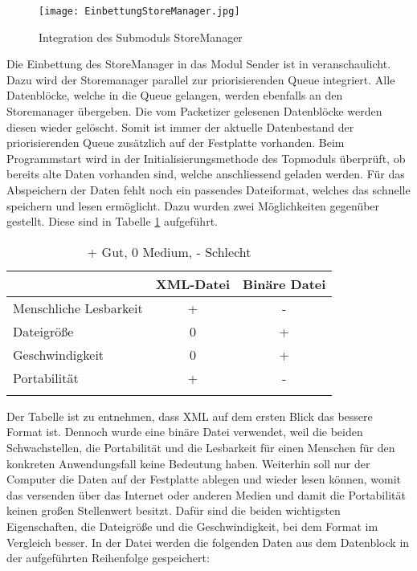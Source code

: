 \begin{figure}[htb]
\centering
\texttt{[image: EinbettungStoreManager.jpg]}
\caption{Integration des Submoduls StoreManager}
\label{fig:EinbettungStoreManager}
\end{figure}

Die Einbettung des StoreManager in das Modul Sender ist in 
 veranschaulicht. Dazu wird der Storemanager
parallel zur priorisierenden Queue integriert. Alle Datenblöcke, welche in
die Queue gelangen, werden ebenfalls an den Storemanager übergeben. Die vom
Packetizer gelesenen Datenblöcke werden diesen wieder gelöscht. Somit
ist immer der aktuelle Datenbestand der priorisierenden Queue zusätzlich auf der
Festplatte vorhanden. Beim Programmstart wird in der
Initialisierungsmethode des Topmoduls überprüft, ob bereits alte Daten
vorhanden sind, welche anschliessend geladen werden. \newline
Für das Abspeichern der Daten fehlt noch ein passendes Dateiformat,
welches das schnelle speichern und lesen ermöglicht. Dazu wurden zwei Möglichkeiten
gegenüber gestellt. Diese sind in Tabelle \ref{tab:Speicherformate} aufgeführt.

\begin{longtable}{|lcc|}
\caption{Vergleich der Speicherformate} \\
\hline
\label{tab:Speicherformate}
\textbf{} & \textbf{XML-Datei} & \textbf{Binäre Datei}\\
\hline
  Menschliche Lesbarkeit      &  + & - \\
  Dateigröße      &  0 & + \\
  Geschwindigkeit &  0 & + \\
  Portabilität    &  + & - \\
\hline
\caption*{ + Gut, 0 Medium, - Schlecht }
\end{longtable}

Der Tabelle ist zu entnehmen, dass XML auf dem ersten Blick das bessere Format
ist. Dennoch wurde eine binäre Datei verwendet, weil die beiden Schwachstellen,
die Portabilität und die Lesbarkeit für einen Menschen für den konkreten
Anwendungsfall keine Bedeutung haben.
Weiterhin soll nur der Computer die Daten auf der Festplatte ablegen und
wieder lesen können, womit das versenden über das Internet oder anderen Medien
und damit die Portabilität keinen großen Stellenwert besitzt.
Dafür sind die beiden wichtigsten Eigenschaften, die Dateigröße und die
Geschwindigkeit, bei dem Format im Vergleich besser.
\newline
In der Datei werden die folgenden Daten aus dem Datenblock in der
aufgeführten Reihenfolge gespeichert:


